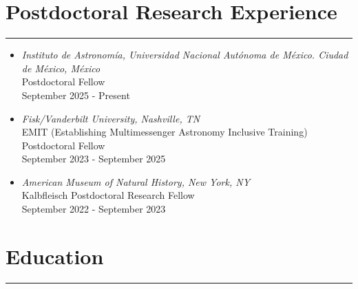 \documentclass[letterpaper,10pt]{article}
\begin{document}
\section*{Postdoctoral Research Experience}

\hrule
\vspace{.3 cm}
\begin{itemize}[label=$\blacktriangleright$]


 \item \emph{Instituto de Astronom\'ia, Universidad Nacional Aut\'onoma de M\'exico. Ciudad de M\'exico, M\'exico }\\
Postdoctoral Fellow \\
 September 2025 - Present


 \item \emph{Fisk/Vanderbilt University, Nashville, TN}\\
 EMIT (Establishing Multimessenger Astronomy Inclusive Training) Postdoctoral Fellow \\
 September 2023 - September 2025



 \item \emph{American Museum of Natural History, New York, NY}\\
 Kalbfleisch Postdoctoral Research Fellow  \\
  September 2022 - September 2023\\
 

 

\end{itemize}



\section*{Education}

\hrule
\vspace{.3 cm}
\end{document}
